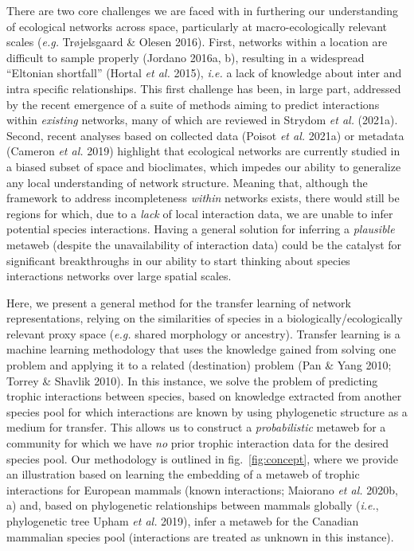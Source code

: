 \documentclass[11pt]{article}
\begin{document}
There are two core challenges we are faced with in furthering our
understanding of ecological networks across space, particularly at
macro-ecologically relevant scales (\emph{e.g.} Trøjelsgaard \& Olesen
2016). First, networks within a location are difficult to sample
properly (Jordano 2016a, b), resulting in a widespread ``Eltonian
shortfall'' (Hortal \emph{et al.} 2015), \emph{i.e.} a lack of knowledge
about inter and intra specific relationships. This first challenge has
been, in large part, addressed by the recent emergence of a suite of
methods aiming to predict interactions within \emph{existing} networks,
many of which are reviewed in Strydom \emph{et al.} (2021a). Second,
recent analyses based on collected data (Poisot \emph{et al.} 2021a) or
metadata (Cameron \emph{et al.} 2019) highlight that ecological networks
are currently studied in a biased subset of space and bioclimates, which
impedes our ability to generalize any local understanding of network
structure. Meaning that, although the framework to address
incompleteness \emph{within} networks exists, there would still be
regions for which, due to a \emph{lack} of local interaction data, we
are unable to infer potential species interactions. Having a general
solution for inferring a \emph{plausible} metaweb (despite the
unavailability of interaction data) could be the catalyst for
significant breakthroughs in our ability to start thinking about species
interactions networks over large spatial scales.

Here, we present a general method for the transfer learning of network
representations, relying on the similarities of species in a
biologically/ecologically relevant proxy space (\emph{e.g.} shared
morphology or ancestry). Transfer learning is a machine learning
methodology that uses the knowledge gained from solving one problem and
applying it to a related (destination) problem (Pan \& Yang 2010; Torrey
\& Shavlik 2010). In this instance, we solve the problem of predicting
trophic interactions between species, based on knowledge extracted from
another species pool for which interactions are known by using
phylogenetic structure as a medium for transfer. This allows us to
construct a \emph{probabilistic} metaweb for a community for which we
have \emph{no} prior trophic interaction data for the desired species
pool. Our methodology is outlined in fig.~\ref{fig:concept}, where we
provide an illustration based on learning the embedding of a metaweb of
trophic interactions for European mammals (known interactions; Maiorano
\emph{et al.} 2020b, a) and, based on phylogenetic relationships between
mammals globally (\emph{i.e.}, phylogenetic tree Upham \emph{et al.}
2019), infer a metaweb for the Canadian mammalian species pool
(interactions are treated as unknown in this instance).
\end{document}
